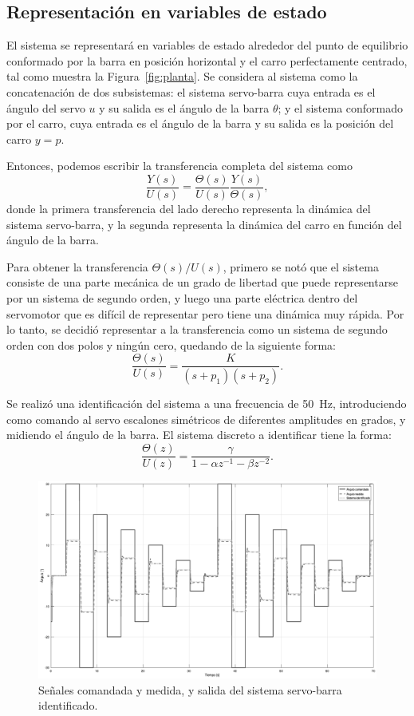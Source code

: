 \subsection{Representación en variables de estado}

El sistema se representará en variables de estado alrededor del punto de equilibrio conformado por la barra en posición horizontal y el carro perfectamente centrado, tal como muestra la Figura~\ref{fig:planta}. Se considera al sistema como la concatenación de dos subsistemas: el sistema servo-barra cuya entrada es el ángulo del servo $u$ y su salida es el ángulo de la barra $\theta$; y el sistema conformado por el carro, cuya entrada es el ángulo de la barra y su salida es la posición del carro $y = p$.

Entonces, podemos escribir la transferencia completa del sistema como
\[
    \frac{Y(s)}{U(s)} = \frac{\Theta(s)}{U(s)} \frac{Y(s)}{\Theta(s)},
\]
donde la primera transferencia del lado derecho representa la dinámica del sistema servo-barra, y la segunda representa la dinámica del carro en función del ángulo de la barra.

Para obtener la transferencia $\Theta(s) / U(s)$, primero se notó que el sistema consiste de una parte mecánica de un grado de libertad que puede representarse por un sistema de segundo orden, y luego una parte eléctrica dentro del servomotor que es difícil de representar pero tiene una dinámica muy rápida. Por lo tanto, se decidió representar a la transferencia como un sistema de segundo orden con dos polos y ningún cero, quedando de la siguiente forma:
\[
    \frac{\Theta(s)}{U(s)} = \frac{K}{(s+p_1)(s+p_2)}.
\]

Se realizó una identificación del sistema a una frecuencia de \qty{50}{\Hz}, introduciendo como comando al servo escalones simétricos de diferentes amplitudes en grados, y midiendo el ángulo de la barra. El sistema discreto a identificar tiene la forma:
\[
    \frac{\Theta(z)}{U(z)} = \frac{\gamma}{1 - \alpha z^{-1} - \beta z^{-2}}.
\]

\begin{figure}[!htbp]
    \centering
    \includegraphics[width=\linewidth]{img/ident-barra.eps}
    \caption{Señales comandada y medida, y salida del sistema servo-barra identificado.}
    \label{fig:ident-barra}
\end{figure}

